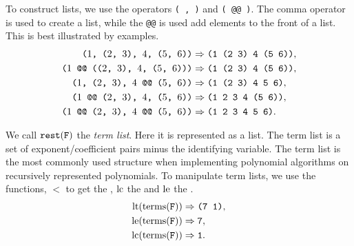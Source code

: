 To construct lists, we use the operators {\tt ( , )} and {\tt ( @@ )}.
The comma operator is used to create a list, while the {\tt @@} is used
add elements to the front of a list.  This is best illustrated by
examples.
\[
\begin{aligned}
\mbox{\tt ($1$, ($2$, $3$), $4$, ($5$, $6$))} 
   & \Rightarrow \mbox{\tt (1 (2 3) 4 (5 6))},\\
\mbox{\tt ($1$ @@ (($2$, $3$), $4$, ($5$, $6$)))} 
   & \Rightarrow \mbox{\tt (1 (2 3) 4 (5 6))},\\
\mbox{\tt ($1$,  ($2$, $3$), $4$ @@ ($5$, $6$))} 
   & \Rightarrow \mbox{\tt (1 (2 3) 4 5 6)},\\
\mbox{\tt ($1$ @@  ($2$, $3$), $4$, ($5$, $6$))} 
   & \Rightarrow \mbox{\tt (1 2 3 4 (5 6))},\\
\mbox{\tt ($1$ @@  ($2$, $3$), $4$ @@ ($5$, $6$))} 
   & \Rightarrow \mbox{\tt (1 2 3 4 5 6)}.
\end{aligned}
\]

We call $\mathop{\tt rest}\nolimits(\mbox{\tt F})$ the {\em term list}.  Here it is represented as a list.  The term list is a set
of exponent/coefficient pairs minus the identifying variable.  The
term list is the most commonly used structure when implementing
polynomial algorithms on recursively represented polynomials.  To
manipulate term lists, we use the functions, $\lt$ to get the
, $\operatorname{lc}$ the  and $\operatorname{le}$
the .
\[
\begin{aligned}
\operatorname{lt}(\operatorname{terms}(\mbox{\tt F}))& \Rightarrow \mbox{\tt (7 1)}, \\
\operatorname{le}(\operatorname{terms}(\mbox{\tt F}))& \Rightarrow \mbox{\tt 7}, \\
\operatorname{lc}(\operatorname{terms}(\mbox{\tt F}))& \Rightarrow \mbox{\tt 1}.
\end{aligned}
\]

